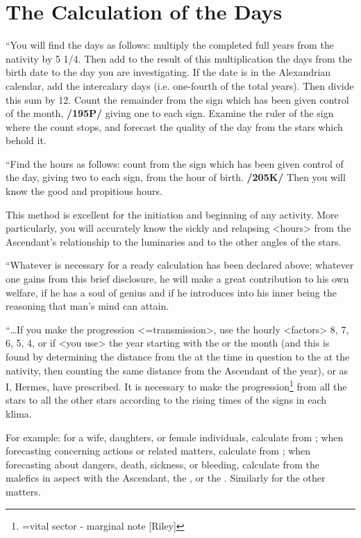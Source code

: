 \section{The Calculation of the Days}

“You will find the days as follows: multiply the completed full years from the nativity by 5 1/4.
Then add to the result of this multiplication the days from the birth date to the day you are investigating.
If the date is in the Alexandrian calendar, add the intercalary days (i.e. one-fourth of the total years). Then divide this sum by 12. Count the remainder from the sign which has been given control of the month, \textbf{/195P/} giving one to each sign. Examine the ruler of the sign where the count stops, and forecast the quality of the day from the stars which behold it.

“Find the hours as follows: count from the sign which has been given control of the day, giving two to each sign, from the hour of birth. \textbf{/205K/} Then you will know the good and propitious hours. 

This method is excellent for the initiation and beginning of any activity. More particularly, you will accurately
know the sickly and relapsing <hours> from the Ascendant’s relationship to the luminaries and to the other angles of the stars.

“Whatever is necessary for a ready calculation has been declared above; whatever one gains from this brief disclosure, he will make a great contribution to his own welfare, if he has a soul of genius and if he introduces into his inner being the reasoning that man’s mind can attain.

“…If you make the progression <=transmission>, use the hourly <factors> 8, 7, 6, 5, 4, or if <you
use> the year starting with the \Sun\xspace or the month (and this is found by determining the distance from the \Sun\xspace at the time in question to the \Moon\xspace at the nativity, then counting the same distance from the Ascendant of the year), or as I, Hermes, have prescribed. It is necessary to make the progression\footnote{ =vital sector - marginal note [Riley]} from all the stars to all the other stars according to the rising times of the signs in each klima. 

For example: for a wife, daughters, or female individuals, calculate from \Venus; when forecasting concerning actions or related matters, calculate from \Mercury; when forecasting about dangers, death, sickness, or bleeding, calculate from the malefics in aspect with the Ascendant, the \Sun, or the \Moon. Similarly for the other matters. 

